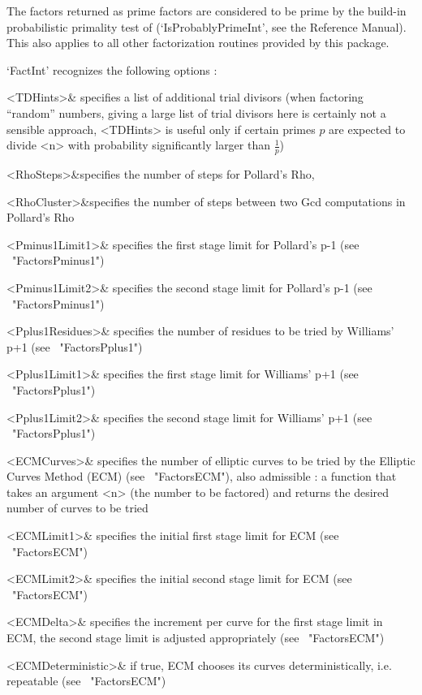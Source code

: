 The factors returned as prime factors are considered to be prime 
by the build-in probabilistic primality test of {\GAP} 
(`IsProbablyPrimeInt', see the Reference Manual).
This also applies to all other factorization routines 
provided by this package.

`FactInt' recognizes the following options :

\beginitems
   <TDHints>& specifies a list of additional trial divisors
   (when factoring ``random'' numbers, giving a large list
   of trial divisors here is certainly not a sensible approach,
   <TDHints> is useful only if certain primes $p$ are expected to
   divide <n> with probability significantly larger than 
   $\frac{1}{p}$)

   <RhoSteps>&specifies the number of steps for Pollard's Rho,

   <RhoCluster>&specifies the number of steps between two
   Gcd computations in Pollard's Rho

   <Pminus1Limit1>& specifies the first stage limit for Pollard's p-1
   (see ~"FactorsPminus1")

   <Pminus1Limit2>& specifies the second stage limit for Pollard's p-1
   (see ~"FactorsPminus1")

   <Pplus1Residues>& specifies the number of residues
   to be tried by Williams' p+1 (see ~"FactorsPplus1")

   <Pplus1Limit1>& specifies the first stage limit
   for Williams' p+1 (see ~"FactorsPplus1")

   <Pplus1Limit2>& specifies the second stage limit
   for Williams' p+1 (see ~"FactorsPplus1")

   <ECMCurves>& specifies the number of elliptic curves to be 
   tried by the Elliptic Curves Method (ECM) (see ~"FactorsECM"),
   also admissible : a function that takes an argument <n>
   (the number to be factored) and returns the desired number
   of curves to be tried 

   <ECMLimit1>& specifies the initial first stage limit
   for ECM (see ~"FactorsECM")

   <ECMLimit2>& specifies the initial second stage limit
   for ECM (see ~"FactorsECM")

   <ECMDelta>& specifies the increment per curve for the 
   first stage limit in ECM, the second stage limit is adjusted
   appropriately (see ~"FactorsECM")

   <ECMDeterministic>& if true, ECM chooses its curves 
   deterministically, i.e. repeatable (see ~"FactorsECM")

